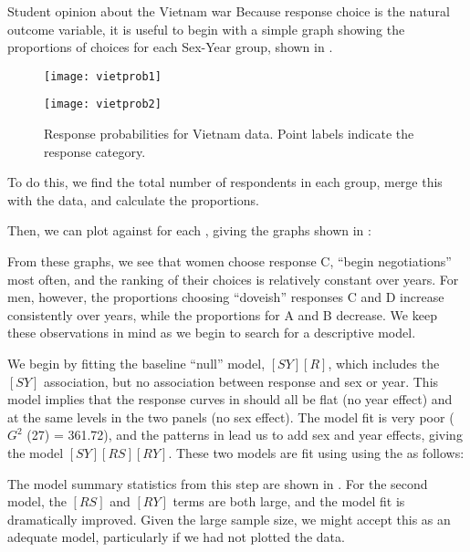 \begin{Example}[vietnam1]{Student opinion about the Vietnam war}
Because response choice is the natural outcome variable, it is useful
to begin with a simple graph showing the proportions of choices
for each Sex-Year group, shown in .
\begin{figure}[htb]
 \begin{minipage}[t]{.49\linewidth}
  \texttt{[image: vietprob1]}
 \end{minipage}%
 \hfill
 \begin{minipage}[t]{.49\linewidth}
  \texttt{[image: vietprob2]}
 \end{minipage}
 \caption[Response probabilities for Vietnam data]{Response probabilities for Vietnam data.  Point labels indicate the response category.}\label{fig:vietprob}
\end{figure}
To do this, we find the total number of respondents in each group,
merge this with the data, and calculate the proportions.

Then, we can plot  against  for each ,
giving the graphs shown in :


From these graphs, we see that women choose response C, ``begin negotiations''
most often, and the ranking of their choices is relatively
constant over years.
For men, however, the proportions choosing ``doveish'' responses C and D increase
consistently over years, while the proportions for A and B decrease.
We keep these observations in mind as we begin to search for a descriptive model.

We begin by fitting the baseline ``null'' model, $[SY][R]$, which includes the
$[SY]$ association, but no association between response and sex or year.
This model implies that the response curves in 
should all be flat (no year effect) and at the same levels in the two
panels (no sex effect).
The model fit is very poor ($G^2$ (27) = 361.72), and the patterns in
 lead us to add sex and year effects, giving
the model $[SY][RS][RY]$.
These two models are fit using  using the
 as follows:


The model summary statistics from this step are shown in
.  For the second model, the
$[RS]$ and $[RY]$ terms are both large, and the model
fit is dramatically improved.
Given the large sample size, we might accept this as
an adequate model, particularly if we had not plotted the data.


\end{Example}
